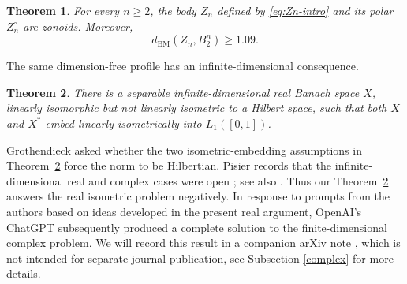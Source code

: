 \documentclass[11pt]{article}
\newtheorem{theorem}{Theorem}[section]
\newtheorem{corollary}[theorem]{Corollary}
\theoremstyle{definition}
\theoremstyle{remark}
\newcommand{\R}{\mathbb R}
\newcommand{\BM}{\mathrm{BM}}
\newcommand{\erf}{\operatorname{erf}}
\begin{document}
\begin{theorem}\label{thm:main-finite}
For every $n\geq2$, the body $Z_n$ defined by
\eqref{eq:Zn-intro} and its polar $Z_n^\circ$ are zonoids.  Moreover,
\begin{equation}\label{eq:main-distance}
 d_{\BM}(Z_n,B_2^n)%
 \ge 1.09.
\end{equation}
\end{theorem}







The same dimension-free profile has an infinite-dimensional consequence.

\begin{theorem}\label{thm:main-infinite-intro}
There is a separable infinite-dimensional real Banach space $X$,
linearly isomorphic but not linearly isometric to a Hilbert space,
such that both $X$ and $X^*$ embed linearly isometrically into
$L_1([0,1])$.
\end{theorem}

Grothendieck asked whether the two isometric-embedding assumptions in
Theorem~\ref{thm:main-infinite-intro} force the norm to be Hilbertian.
Pisier records that the infinite-dimensional real and complex cases
were open \cite[p.~249, immediately after
Corollary~2.7]{Pisier2012}; see also \cite[p.~1]{Lonke1997}.
Thus our Theorem~\ref{thm:main-infinite-intro} answers the real isometric
problem negatively.  In response to prompts from the authors based on ideas developed in
the present real argument, OpenAI's ChatGPT subsequently produced a
complete solution to the finite-dimensional complex problem.  We will record this result in a companion
arXiv note \cite{RyaboginZvavitchComplex}, which is not intended for
separate journal publication, see Subsection \ref{complex} for more details.
\end{document}
